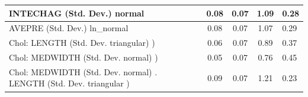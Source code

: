 \begin{table}
\begin{center}
\begin{tabular}{|l|l|c|c|c|l|}
			\hline
			INTECHAG (Std. Dev.) normal &  & 0.08 & 0.07 & 1.09 & 0.28 \\
			\hline
			AVEPRE (Std. Dev.) ln_normal &  & 0.08 & 0.07 & 1.07 & 0.29 \\
			\hline
			 Chol: LENGTH (Std. Dev. triangular) ) &  & 0.06 & 0.07 & 0.89 & 0.37 \\
			\hline
			 Chol: MEDWIDTH (Std. Dev. normal) ) &  & 0.05 & 0.07 & 0.76 & 0.45 \\
			\hline
			 Chol: MEDWIDTH (Std. Dev. normal) . LENGTH (Std. Dev.   triangular ) &  & 0.09 & 0.07 & 1.21 & 0.23 \\
			\hline
		\end{tabular}
	\end{center}
\end{table}